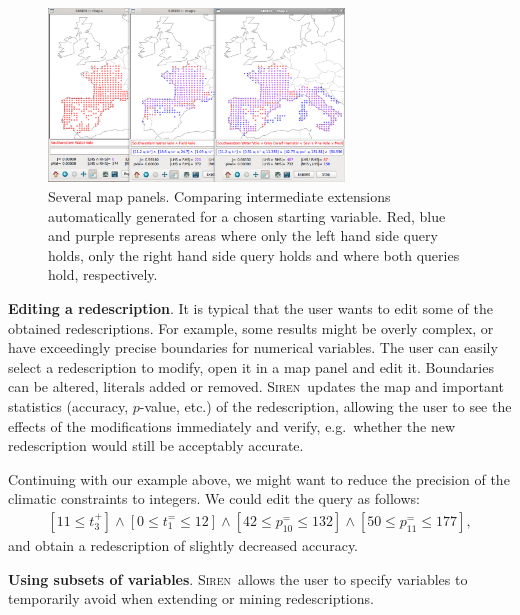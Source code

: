 \documentclass{llncs}
\newcommand{\prg}[1]{\textbf{#1}.}
\newcommand{\Siren}{\textsc{Siren}}
\begin{document}
\begin{figure}
  \centering
\includegraphics[width=0.7\textwidth]{screenshots/comparison.png}
  \caption{Several map panels. Comparing intermediate extensions automatically generated for a chosen starting variable. Red, blue and purple represents areas where only the left hand side query holds, only the right hand side query holds and where both queries hold, respectively.}
  \label{fig:comparison}
\end{figure}

\prg{Editing a redescription} It is typical that the user wants to
edit some of the obtained redescriptions. For example, some results
might be overly complex, or have exceedingly precise boundaries for
numerical variables. The user can easily select a redescription to
modify, open it in a map panel and edit it. Boundaries can be altered,
literals added or removed. \Siren\ updates the map and important
statistics (accuracy, $p$-value, etc.) of the redescription, allowing
the user to see the effects of the modifications immediately and
verify, e.g.\ whether the new redescription would still be acceptably
accurate.

Continuing with our example above, we might want to reduce the
precision of the climatic constraints to integers. We could edit the
query as follows:
\begin{equation*}
\begin{array}{l}
[11 \leq t_{3}^{+}] \land  [0 \leq t_{1}^{=} \leq 12]%
\land  [42 \leq p_{10}^{=} \leq 132] \land [50 \leq p_{11}^{=} \leq 177],
\end{array}
\end{equation*}
and obtain a redescription of slightly decreased accuracy. %

\prg{Using subsets of variables} 
\Siren\ allows the user to specify variables to temporarily 
avoid when extending or mining redescriptions.
\end{document}
